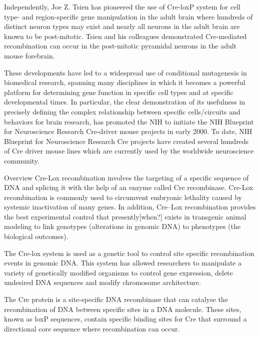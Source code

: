 Independently, Joe Z. Tsien has pioneered the use of Cre-loxP system for cell type- and region-specific gene manipulation in the adult brain where hundreds of distinct neuron types may exist and nearly all neurons in the adult brain are known to be post-mitotic. Tsien and his colleagues demonstrated Cre-mediated recombination can occur in the post-mitotic pyramidal neurons in the adult mouse forebrain.

These developments have led to a widespread use of conditional mutagenesis in biomedical research, spanning many disciplines in which it becomes a powerful platform for determining gene function in specific cell types and at specific developmental times. In particular, the clear demonstration of its usefulness in precisely defining the complex relationship between specific cells/circuits and behaviors for brain research, has promoted the NIH to initiate the NIH Blueprint for Neuroscience Research Cre-driver mouse projects in early 2000. To date, NIH Blueprint for Neuroscience Research Cre projects have created several hundreds of Cre driver mouse lines which are currently used by the worldwide neuroscience community.

Overview
Cre-Lox recombination involves the targeting of a specific sequence of DNA and splicing it with the help of an enzyme called Cre recombinase. Cre-Lox recombination is commonly used to circumvent embryonic lethality caused by systemic inactivation of many genes. In addition, Cre--Lox recombination provides the best experimental control that presently{[}when?{]} exists in transgenic animal modeling to link genotypes (alterations in genomic DNA) to phenotypes (the biological outcomes).

The Cre-lox system is used as a genetic tool to control site specific recombination events in genomic DNA. This system has allowed researchers to manipulate a variety of genetically modified organisms to control gene expression, delete undesired DNA sequences and modify chromosome architecture.

The Cre protein is a site-specific DNA recombinase that can catalyse the recombination of DNA between specific sites in a DNA molecule. These sites, known as loxP sequences, contain specific binding sites for Cre that surround a directional core sequence where recombination can occur.

